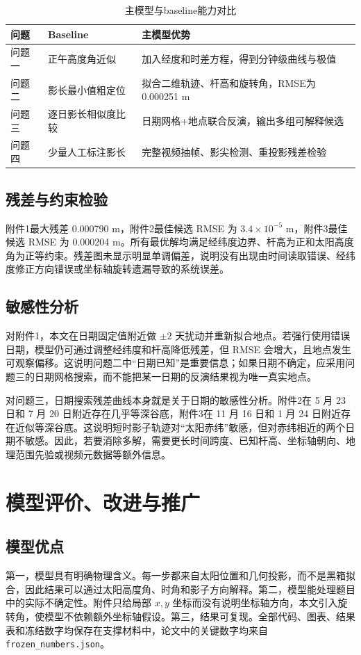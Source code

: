 \documentclass[UTF8,a4paper,12pt]{ctexart}
\begin{document}
\begin{table}[H]
\centering
\caption{主模型与baseline能力对比}
\begin{tabular}{p{}p{}p{}}
\toprule
问题 & Baseline & 主模型优势\\
\midrule
问题一 & 正午高度角近似 & 加入经度和时差方程，得到分钟级曲线与极值\\
问题二 & 影长最小值粗定位 & 拟合二维轨迹、杆高和旋转角，RMSE为0.000251 m\\
问题三 & 逐日影长相似度比较 & 日期网格+地点联合反演，输出多组可解释候选\\
问题四 & 少量人工标注影长 & 完整视频抽帧、影尖检测、重投影残差检验\\
\bottomrule
\end{tabular}
\end{table}

\subsection{残差与约束检验}
附件1最大残差 0.000790 m，附件2最佳候选 RMSE 为 $3.4\times10^{-5}$ m，附件3最佳候选 RMSE 为 0.000204 m。所有最优解均满足经纬度边界、杆高为正和太阳高度角为正等约束。残差图未显示明显单调偏差，说明没有出现由时间读取错误、经纬度修正方向错误或坐标轴旋转遗漏导致的系统误差。

\subsection{敏感性分析}
对附件1，本文在日期固定值附近做 $\pm2$ 天扰动并重新拟合地点。若强行使用错误日期，模型仍可通过调整经纬度和杆高降低残差，但 RMSE 会增大，且地点发生可观察偏移。这说明问题二中“日期已知”是重要信息；如果日期不确定，应采用问题三的日期网格搜索，而不能把某一日期的反演结果视为唯一真实地点。

对问题三，日期搜索残差曲线本身就是关于日期的敏感性分析。附件2在 5 月 23 日和 7 月 20 日附近存在几乎等深谷底，附件3在 11 月 16 日和 1 月 24 日附近存在近似等深谷底。这说明短时影子轨迹对“太阳赤纬”敏感，但对赤纬相近的两个日期不敏感。因此，若要消除多解，需要更长时间跨度、已知杆高、坐标轴朝向、地理范围先验或视频元数据等额外信息。

\section{模型评价、改进与推广}
\subsection{模型优点}
第一，模型具有明确物理含义。每一步都来自太阳位置和几何投影，而不是黑箱拟合，因此结果可以通过太阳高度角、时角和影子方向解释。第二，模型能处理题目中的实际不确定性。附件只给局部 $x,y$ 坐标而没有说明坐标轴方向，本文引入旋转角，使模型不依赖额外坐标轴假设。第三，结果可复现。全部代码、图表、结果表和冻结数字均保存在支撑材料中，论文中的关键数字均来自 \verb|frozen_numbers.json|。
\end{document}

